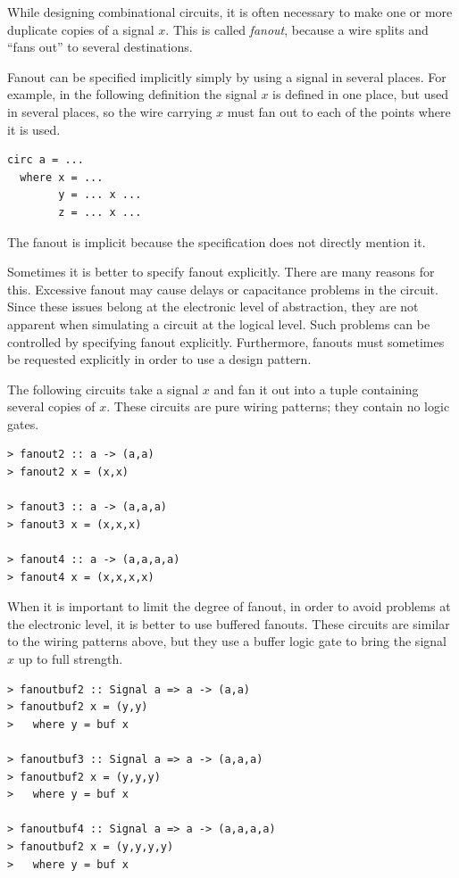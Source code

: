 \documentclass[a4paper,openany,fleqn]{book}
\begin{document}
While designing combinational circuits, it is often necessary to make
one or more duplicate copies of a signal $x$.  This is called
\textit{fanout}, because a wire splits and ``fans out'' to several
destinations.

Fanout can be specified implicitly simply by using a signal in several
places.  For example, in the following definition the signal $x$ is
defined in one place, but used in several places, so the wire carrying
$x$ must fan out to each of the points where it is used.
\begin{verbatim}
circ a = ...
  where x = ...
        y = ... x ...
        z = ... x ...
\end{verbatim}
The fanout is implicit because the specification does not directly
mention it.

Sometimes it is better to specify fanout explicitly.  There are many
reasons for this.  Excessive fanout may cause delays or capacitance
problems in the circuit.  Since these issues belong at the electronic
level of abstraction, they are not apparent when simulating a circuit
at the logical level.  Such problems can be controlled by specifying
fanout explicitly.  Furthermore, fanouts must sometimes be requested
explicitly in order to use a design pattern.

The following circuits take a signal $x$ and fan it out into a tuple
containing several copies of $x$.  These circuits are pure wiring
patterns; they contain no logic gates.

\begin{verbatim}
> fanout2 :: a -> (a,a)
> fanout2 x = (x,x)

> fanout3 :: a -> (a,a,a)
> fanout3 x = (x,x,x)

> fanout4 :: a -> (a,a,a,a)
> fanout4 x = (x,x,x,x)
\end{verbatim}

When it is important to limit the degree of fanout, in order to avoid
problems at the electronic level, it is better to use buffered
fanouts.  These circuits are similar to the wiring patterns above, but
they use a buffer logic gate to bring the signal $x$ up to full
strength.

\begin{verbatim}
> fanoutbuf2 :: Signal a => a -> (a,a)
> fanoutbuf2 x = (y,y)
>   where y = buf x

> fanoutbuf3 :: Signal a => a -> (a,a,a)
> fanoutbuf2 x = (y,y,y)
>   where y = buf x

> fanoutbuf4 :: Signal a => a -> (a,a,a,a)
> fanoutbuf2 x = (y,y,y,y)
>   where y = buf x
\end{verbatim}
\end{document}
